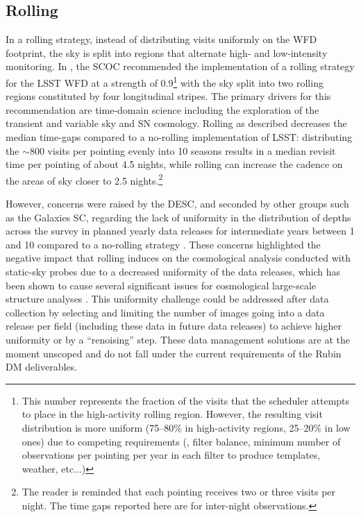 \subsection{Rolling}\label{sec:rolling}
In a rolling strategy, instead of distributing visits uniformly on the WFD footprint, the sky is split into regions that alternate high- and low-intensity monitoring. In , the SCOC recommended the implementation of a rolling strategy for the LSST WFD at a strength of 0.9\footnote{This number represents the fraction of the visits that the scheduler attempts to place in the high-activity rolling region. However, the resulting visit distribution is more uniform (75--80\% in high-activity regions, 25--20\% in low ones) due to competing requirements (\eg , filter balance, minimum number of observations per pointing per year in each filter to produce templates, weather, etc...)} 
with the sky split into two rolling regions constituted by four longitudinal stripes. The primary drivers for this recommendation are time-domain science including the exploration of the transient and variable sky and SN cosmology. Rolling as described decreases the median time-gaps compared to a no-rolling implementation of LSST:
distributing the $\sim$800 visits per pointing evenly into 10 seasons results in a median revisit time per pointing of about 4.5 nights, while rolling can increase the cadence on the areas of sky closer to 2.5 nights.\footnote{The reader is reminded that each pointing receives two or three visits per night. The time gaps reported here are for inter-night observations.}

 However, concerns were raised by the DESC, and seconded by other groups such as the Galaxies SC, regarding the lack of uniformity in the distribution of depths across the survey in planned yearly data releases for intermediate years between 1 and 10 compared to a no-rolling strategy \citep[see discussion in][which noted this as a potential future concern before the adoption of a rolling cadence as the baseline]{2022ApJS..259...58L}.  These concerns highlighted the negative impact that rolling induces on the cosmological analysis conducted with static-sky probes due to a decreased uniformity of the data releases, which has been shown to cause several significant issues for cosmological large-scale structure analyses \citep[\eg ,][]{2022PhRvD.105b3520A,2023JCAP...07..044B}.  
 This uniformity challenge could be addressed after data collection by selecting and limiting the number of images going into a data release per field (including these data in future data releases) to achieve higher uniformity or by a ``renoising'' step. These data management solutions are at the moment unscoped and do not fall under the current requirements of the Rubin DM deliverables.

